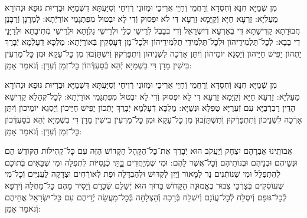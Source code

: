 \documentclass[twoside, openany, parskip=half, 11pt]{book}
\begin{document}

\shabbos\\
מִן שְֿׁמַיָּא חִנָּא וְֿחִסְדָּא וְֿרַחֲמֵי וְֿחַיֵּי אֲרִיכֵי וּמְזוֹנֵי רְֿוִיחֵי וְֿסִיַּעְתָּא דִשְּֿׁמַיָּא וּבַרְיוּת גּוּפָא וּנְהוֹרָא מַעַלְיָא: זַרְעָא חַיָּא וְֿקַיָּמָא זַרְעָא דִּי לֹא יִפְסוּק וְֿדִי לָא יִבְטוּל מִפִּתְגָּמֵי אוֹרַיְֿתָא: לְֿמָרָנָן וְֿרַבָּנָן חֲבוּרָתָא קַדִּישָׁתָא דִּי בְֿאַרְעָא דְֿיִשְׂרָאֵל וְֿדִי בְּֿבָבֶל לְֿרֵישֵׁי כַלֵּי וּלְרֵישֵׁי גַלְוָתָא וּלְרֵישֵׁי מְֿתִיבָתָא וּלְדַיָּנֵי דִי בָבָא: לְֿכׇל־תַּלְמִידֵיהוֹן וּלְכׇל־תַּלְמִידֵי תַלְמִידֵיהוֹן וּלְכׇל־מָן דְּֿעָסְֿקִין בְּֿאוֹרַיְֿתָא: מַלְכָּא דְֿעָלְֿמָא יְֿבָרֵךְ יַתְהוֹן יַפִּישׁ חַיֵּיהוֹן וְֿיַסְגֵּא יוֹמֵיהוֹן וְֿיִתֵּן אָרְֿכָה לִשְׁנֵיהוֹן וְֿיִתְפָּרְֿקוּן וְֿיִשְׁתֵּזְֿבוּן מִן כׇּל־עָקָא וּמִן כׇּל־מַרְעִין בִּישִׁין מָרָן דִּי בִשְׁמַיָּא יְֿהֵא בְּֿסַעְדְּֿהוֹן כׇּל־זְמַן וְֿעִדָּן: וְֿנֹאמַר אָמֵן:



מִן שְֿׁמַיָּא חִנָּא וְֿחִסְדָּא וְֿרַחֲמֵי וְֿחַיֵּי אֲרִיכֵי וּמְזוֹנֵי רְֿוִיחֵי וְֿסִיַּעְתָּא דִּשְׁמַיָּא וּבַרְיוּת גּוּפָא וּנְהוֹרָא מַעַלְיָא: זַרְעָא חַיָּא וְֿקַיָּמָא זַרְעָא דִּי לָא יִפְסוּק וְֿדִי לָא יִבְטוּל מִפִּתְגָּמֵי אוֹרַיְֿתָא: לְֿכׇל־קְהָלָא קַדִּישָׁא הָדֵין רַבְרְֿבַיָּא עִם זְֿעֵרַיָּא טַפְלָא וּנְשַׁיָּא: מַלְכָּא דְֿעָלְֿמָא יְֿבָרֵךְ יָתְֿכוֹן יַפִּישׁ חַיֵּיכוֹן וְֿיַסְגֵּא יוֹמֵיכוֹן וְֿיִתֵּן אָרְֿכָה לִשְׁנֵיכוֹן וְֿתִתְפָּרְֿקוּן וְֿתִשְׁתֵּזְֿבוּן מִן כׇּל־עָקָא וּמִן כׇּל־מַרְעִין בִּישִׁין מָרָן דִּי בִשְׁמַיָּא יְֿהֵא בְּֿסַעְדְּֿכוֹן כׇּל־זְמַן וְֿעִדָּן: וְֿנֹאמַר אָמֵן:

אֲבוֹתֵֽינוּ אַבְרָהָם יִצְחָק וְֿיַעֲקֹב הוּא יְֿבָרֵךְ אֶת־כׇּל־הַקָּהָל הַקָּדוֹשׁ הַזֶּה עִם כׇּל־קְהִילּוֹת הַקּוֹדֶשׁ הֵם וּנְשֵׁיהֶם וּבְנֵיהֶם וּבְנוֹתֵיהֶם וְֿכׇל־אֲשֶׁר לָהֶם: וּמִי שֶׁמְּֿיַחֲדִים בׇׇָּתֵּי כְֿנֵסִיּוֹת לִתְפִלָּה וּמִי שֶׁבָּאִים בְּֿתוֹכָם לְֿהִתְפַּלֵּל וּמִי שֶׁנּוֹתְֿנִים נֵר לַמָּאוֹר וְֿיַֽיִן לְֿקִדּוּשׁ וּלְהַבְדָּלָה וּפַת לְֿאוֹרְֿחִים וּצְדָקָה לַעֲנִיִּים וְֿכׇל־מִי שֶׁעוֹסְֿקִים בְּֿצָרְֿכֵי צִבּוּר בֶּאֱמוּנָה הַקָּדוֹשׁ בָּרוּךְ הוּא יְֿשַׁלֵם שְֿׂכָרָם וְֿיָסִיר מֵהֶם כׇּל־מַחֲלָה וְֿיִרְפָּא לְֿכׇל־גּוּפָם וְֿיִסְלַח לְֿכׇל־עֲוֹנָם וְֿיִשְׁלַח בְּֿרָכָה וְֿהַצְלָחָה בְּֿכׇל־מַעֲשֵׂה יְֿדֵיהֶם עִם כָּל־יִשְׂרָאֵל אֲחֵיהֶם וְֿנֹאמַר אָמֵן:




\end{document}
